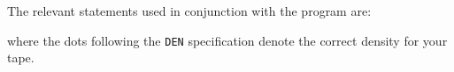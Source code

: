 \documentclass[twoside,11pt,nolof]{starlink}
\begin{document}
The relevant statements used in conjunction with the program are:
where the dots following the \texttt{DEN} specification denote the correct
density for your tape.


\end{document}
